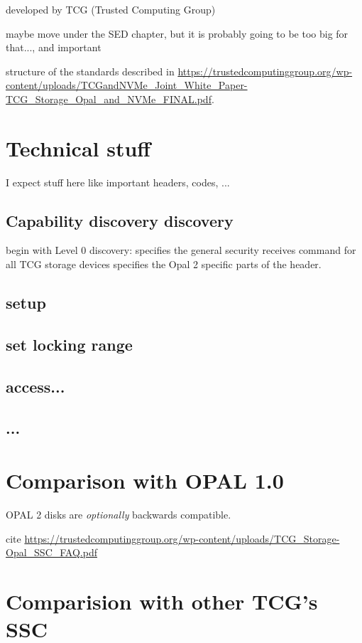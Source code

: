 \documentclass[
  digital, %
  oneside, %
  nolof,     %
  nolot,     %
]{fithesis4}
\begin{document}
developed by TCG (Trusted Computing Group)

maybe move under the SED chapter, but it is probably going to be too big for that..., and important


structure of the standards described in \url{https://trustedcomputinggroup.org/wp-content/uploads/TCGandNVMe_Joint_White_Paper-TCG_Storage_Opal_and_NVMe_FINAL.pdf}.



\section{Technical stuff}

I expect stuff here like important headers, codes, ...

\subsection{Capability discovery discovery}


begin with Level 0 discovery: \parencite[3.3.6]{tcg-storage-core} specifies the general security receives command for all TCG storage devices \cite[3.1.1]{tcg-opal2} specifies the Opal 2 specific parts of the header.

\subsection{setup}
\subsection{set locking range}
\subsection{access...}
\subsection{...}


\section{Comparison with OPAL 1.0}

OPAL 2 disks are \emph{optionally} backwards compatible.

cite \url{https://trustedcomputinggroup.org/wp-content/uploads/TCG_Storage-Opal_SSC_FAQ.pdf}

\section{Comparision with other TCG's SSC}
\end{document}
